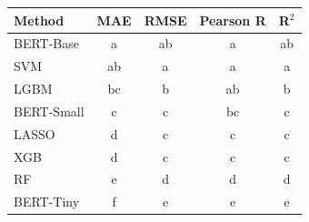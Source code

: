\begin{tabular}{lcccc}
\toprule
Method & MAE & RMSE & Pearson R & R$^2$ \\
\midrule
BERT-Base & a & ab & a & ab \\
SVM & ab & a & a & a \\
LGBM & bc & b & ab & b \\
BERT-Small & c & c & bc & c \\
LASSO & d & c & c & c \\
XGB & d & c & c & c \\
RF & e & d & d & d \\
BERT-Tiny & f & e & e & e \\
\bottomrule
\end{tabular}
